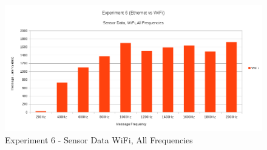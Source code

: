 \documentclass[../dissertation.tex]{subfiles}
\begin{document}
\begin{figure}[H]
\centering
\includegraphics[width=\textwidth]{images/experiment6/sensor_data_wifi_all_freqs_mean.png}
\caption{Experiment 6 - Sensor Data WiFi, All Frequencies}
\label{exp6-sensor-wifi-all-freq-mean}
\end{figure}
\end{document}

